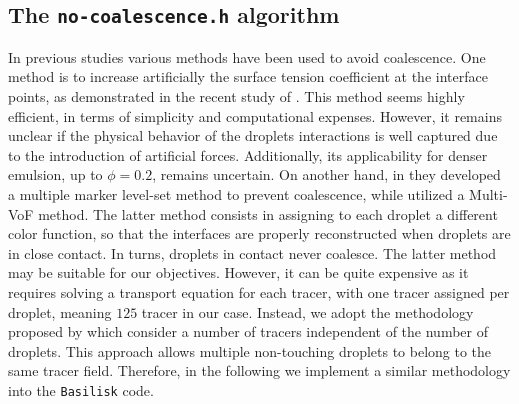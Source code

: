 \subsection{The \texttt{no-coalescence.h} algorithm}

In previous studies various methods have been used to avoid coalescence. 
One method is to increase artificially the surface tension coefficient at the interface points, as demonstrated in the recent study of \citet{hidman2023assessing}.
This method seems highly efficient, in terms of simplicity and computational expenses. However, it remains unclear if the physical behavior of the droplets interactions is well captured due to the introduction of artificial forces. 
Additionally, its applicability for denser emulsion, up to $\phi = 0.2$, remains uncertain. 
On another hand, in \citet{balcazar2015multiple} they developed a multiple marker level-set method to prevent coalescence, while \citet{zhang2021direct} utilized a Multi-VoF method. 
The latter method consists in assigning to each droplet a different color function, so  that the interfaces are properly reconstructed when droplets are in close contact.
In turns, droplets in contact never coalesce.  
The latter method may be suitable for our objectives. 
However, it can be quite expensive as it requires solving a transport equation for each tracer, with one tracer assigned per droplet, meaning $125$ tracer in our case. 
Instead, we adopt the methodology proposed by \citet{karnakov2022computing} which consider a number of tracers independent of the number of droplets.
This approach allows multiple non-touching droplets to belong to the same tracer field.
Therefore, in the following we implement a similar methodology into the \texttt{Basilisk} code. 

